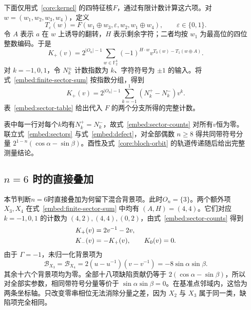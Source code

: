 下面仅用式~\eqref{core:kernel} 的四特征核$F$，通过有限计数计算这六项。对 $w=(w_1,w_2,w_3,w_4)$，定义
\begin{equation}
 T_\varepsilon(w)=F(w_1\oplus w_3,\varepsilon,w_2,w_1\oplus w_4),
 \qquad\varepsilon\in\{0,1\}.
 \label{embed:restricted-kernel}
\end{equation}
令 $A$ 表示 $a$ 在 $w$ 上诱导的翻转，$H$ 表示剩余字符；二者均按 $w_1$ 为最高位的四位整数编码。于是
\begin{equation}
 K_+(v)=2^{|O_n|-1}\sum_{w\in\mathbb F_2^4}
 (-1)^{H\cdot w}v^{T_0(w)-T_1(w\oplus A)}.
 \label{embed:finite-sector-sum}
\end{equation}
对 $k=-1,0,1$，令 $N_k^\pm$ 计数指数为 $k$、字符符号为 $\pm1$ 的输入。将式~\eqref{embed:finite-sector-sum} 按指数分组，得到
\begin{equation}
 K_+(v)=2^{|O_n|-1}\sum_{k=-1}^{1}(N_k^+-N_k^-)v^k.
 \label{embed:sector-counts}
\end{equation}
表~\ref{embed:sector-table} 给出代入 $F$ 的两个分支所得的完整计数。

表中每一行对每个$k$均有$N_k^+=N_k^-$，故式~\eqref{embed:sector-counts} 对所有$v$恒为零。联立式~\eqref{embed:sectors} 与式~\eqref{embed:defect}，对全部偶数 $n\ge8$ 得共同带符号分量 $2^{1-n}(\cos\alpha-\sin\beta)$。酉性及式~\eqref{core:bloch-orbit} 的轨道传递随后给出完整测量结论。

\subsection{\texorpdfstring{$n=6$}{n=6} 时的直接叠加}
\label{embed:app-six-direct}

本节判断$n=6$时直接叠加为何留下混合背景项。此时$O_n=\{3\}$。两个额外项 $X_3,X_4$ 在式~\eqref{embed:finite-sector-sum} 中均有 $(A,H)=(4,4)$。它们对应 $k=-1,0,1$ 的计数为 $(4,2),(4,4),(0,2)$，由式~\eqref{embed:sector-counts} 得到
\begin{align}
 K_+(v)&=2v^{-1}-2v,\notag\\
 K_-(v)&=-K_+(v),\qquad K_0(v)=0.
 \label{embed:six-sectors}
\end{align}
由于 $\Gamma=-1$，未归一化背景项为
\begin{equation}
 \mathcal B_{X_3}=\mathcal B_{X_4}
 =2(u-u^{-1})(v-v^{-1})=-8\sin\alpha\sin\beta.
 \label{embed:six-mixed}
\end{equation}
其余十六个背景项均为零。全部十八项缺陷贡献仍等于 $2(\cos\alpha-\sin\beta)$，所以对全部实参数，相同带符号分量等价于 $\sin\alpha\sin\beta=0$。在基准点邻域内，这恰为两条坐标轴。只改变零串相位无法消除分量之差，因为 $X_2$ 与 $X_3$ 属于同一类，缺陷项完全相同。

